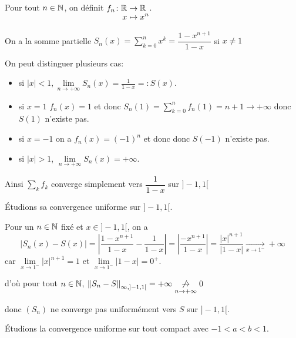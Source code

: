 \documentclass[a4paper,12pt]{article}
\begin{document}
\begin{exemple}
    Pour tout $n \in \mathbb{N}$, on définit $\funcdef{f_n}{\R}{\R}{x}{x^n}$.

    On a la somme partielle $S_n(x) = \sum\limits_{k=0}^n x^k = \dfrac{1-x^{n+1}}{1-x}$ si $x \neq 1$

    On peut distinguer plusieurs cas:

    \begin{itemize}[label=--]
        \item si $|x| < 1, \lim\limits_{n \to +\infty} S_n(x) = \frac{1}{1-x} =: S(x)$.
        \item si $x = 1$ $f_n(x) = 1$ et donc $S_n(1) = \sum\limits_{k=0}^n f_n(1) = n + 1 \to +\infty$ donc $S(1)$ n'existe pas.
        \item si $x = -1$ on a $f_n(x) = (-1)^n$ et donc  donc $S(-1)$ n'existe pas.
        \item si $|x| > 1$, $\lim\limits_{n \to +\infty} S_n(x) = +\infty$.
    \end{itemize}

    Ainsi $\sum\limits_{k}f_k$ converge simplement vers $\dfrac{1}{1 - x}$ sur $]-1, 1[$

    \vspace{1cm}
    
    

    Étudions sa convergence uniforme sur $]-1, 1[$.

    Pour un $n \in \mathbb{N}$ fixé et $x \in ]-1, 1[$, on a
    $$
    |S_n(x) - S(x)| = \left|\dfrac{1 - x^{n+1}}{1 - x} - \dfrac{1}{1 - x}\right| = \left|\dfrac{-x^{n+1}}{1 - x}\right| = \dfrac{|x|^{n+1}}{|1 - x|} \underset{x \to 1^-}{\to} +\infty
    $$
    car $\lim\limits_{x \to 1^-} |x|^{n+1} = 1$ et $\lim\limits_{x \to 1^-} |1 - x| = 0^+$.

    d'où pour tout $n \in \mathbb{N}$, $\left\lVert S_n - S\right\rVert_{\infty, ]-1, 1[} = +\infty \underset{n \to +\infty}{\not\to} 0$ \par donc
    $(S_n)$ ne converge pas uniformément vers $S$ sur $]-1, 1[$.

    \vspace{1cm}

    Étudions la convergence uniforme sur tout compact \text{$J := [a, b] \subset ]-1, 1[$} avec $-1 < a < b < 1$.


\end{exemple}
\end{document}

